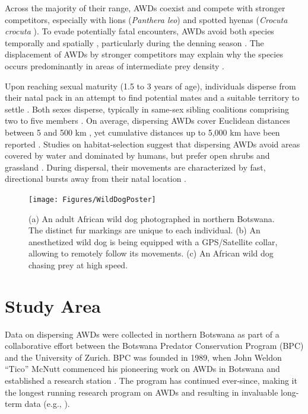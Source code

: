 \documentclass[../FinalThesis.tex]{subfiles}
\begin{document}
Across the majority of their range, AWDs coexist and compete with stronger
competitors, especially with lions (\textit{Panthera leo}) and spotted hyenas
(\textit{Crocuta crocuta} \citealp{Creel.2001, Cozzi.2012, Vogel.2019,
Creel.2023}). To evade potentially fatal encounters, AWDs avoid both species
temporally and spatially \citep{Creel.1996, Cozzi.2012, Droge.2017},
particularly during the denning season \citep{VanDerMeer.2013, Mbizah.2014,
Jackson.2014, Davies.2016, Alting.2021}. The displacement of AWDs by stronger
competitors may explain why the species occurs predominantly in areas of
intermediate prey density \citep{Mills.1997, Mbizah.2014, Creel.2002,
Creel.2023}.

Upon reaching sexual maturity (1.5 to 3 years of age), individuals disperse from
their natal pack in an attempt to find potential mates and a suitable territory
to settle \citep{McNutt.1996, Behr.2020}. Both sexes disperse, typically in
same-sex sibling coalitions comprising two to five members \citep{Frame.1979,
McNutt.1996, Behr.2020}. On average, dispersing AWDs cover Euclidean distances
between 5 and 500 km \citep{Davies-Mostert.2012, Masenga.2016, Cozzi.2020,
Sandoval-Seres.2022}, yet cumulative distances up to 5,000 km have been reported
\citep{Masenga.2016}. Studies on habitat-selection suggest that dispersing AWDs
avoid areas covered by water and dominated by humans, but prefer open shrubs and
grassland \citep{Cozzi.2020, ONeill.2020, Hofmann.2021}. During dispersal, their
movements are characterized by fast, directional bursts away from their natal
location \citep{Cozzi.2020, Hofmann.2021}.

\begin{figure}[htpb]
\begin{center}
  \texttt{[image: Figures/WildDogPoster]}
  \caption{(a) An adult African wild dog photographed in northern Botswana. The
  distinct fur markings are unique to each individual. (b) An anesthetized wild
  dog is being equipped with a GPS/Satellite collar, allowing to remotely follow
  its movements. (c) An African wild dog chasing prey at high speed.}
  \label{WildDog}
\end{center}
\end{figure}

\section{Study Area}
\label{StudyArea}

Data on dispersing AWDs were collected in northern Botswana as part of a
collaborative effort between the Botswana Predator Conservation Program (BPC)
and the University of Zurich. BPC was founded in 1989, when John Weldon ``Tico''
McNutt commenced his pioneering work on AWDs in Botswana and established a
research station \citep{Fuller.1992, McNutt.1996, Osofsky.1996}. The program has
continued ever-since, making it the longest running research program on AWDs and
resulting in invaluable long-term data (e.g., \citealp{McNutt.1996, Cozzi.2012,
Broekhuis.2013, Abrahms.2016, Behr.2020, Jordan.2022}).
\end{document}
